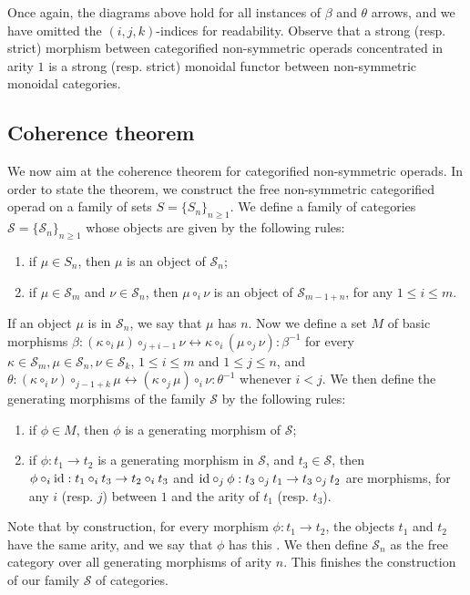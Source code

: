 Once again, the diagrams above hold for all instances of $\beta$ and $\theta$ arrows, and we have omitted the $(i,j,k)$-indices for readability. 
Observe that a strong (resp. strict) morphism between categorified non-symmetric operads concentrated in arity $1$ is a strong (resp. strict) monoidal functor between non-symmetric monoidal categories. 


\subsection{Coherence theorem}

We now aim at the coherence theorem for categorified non-symmetric operads.
In order to state the theorem, we construct the free non-symmetric categorified operad on a family of sets $S=\{S_n\}_{n \geq 1}$.
We define a family of categories $\mathcal{S}=\{\mathcal{S}_n\}_{n \geq 1}$ whose objects are given by the following rules:
\begin{enumerate}
    \item if $\mu \in S_n$, then $\mu$ is an object of $\mathcal{S}_n$;
    \item if $\mu \in \mathcal{S}_m$ and $\nu \in \mathcal{S}_n$, then $\mu \circ_i \nu$ is an object of $\mathcal{S}_{m-1+n}$, for any $1 \leq i \leq m$.
\end{enumerate}
If an object $\mu$ is in $\mathcal{S}_n$, we say that $\mu$ has  $n$. 
Now we define a set $M$ of basic morphisms $\beta: (\kappa \circ_i \mu) \circ_{j+i-1} \nu \leftrightarrow \kappa \circ_i (\mu \circ_j \nu) : \beta^{-1}$ for every $\kappa \in \mathcal{S}_m, \mu \in \mathcal{S}_n, \nu \in \mathcal{S}_k$, $1 \leq i \leq m$ and $1 \leq j \leq n$, and $\theta: (\kappa \circ_i \nu) \circ_{j-1+k} \mu \leftrightarrow (\kappa \circ_j \mu) \circ_i \nu : \theta^{-1}$ whenever $i<j$.
We then define the generating morphisms of the family $\mathcal{S}$ by the following rules:
\begin{enumerate}
    \item if $\phi \in M$, then $\phi$ is a generating morphism of $\mathcal{S}$; 
    \item if $\phi : t_1 \to t_2$ is a generating morphism in $\mathcal{S}$, and $t_3 \in \mathcal{S}$, then $\phi \circ_i \mathrm{id} : t_1 \circ_i t_3 \to t_2 \circ_i t_3$ and $\mathrm{id} \circ_j \phi : t_3 \circ_j t_1 \to t_3 \circ_j t_2$ are  morphisms, for any $i$ (resp. $j$) between $1$ and the arity of $t_1$ (resp. $t_3$).
\end{enumerate}
Note that by construction, for every morphism $\phi : t_1 \to t_2$, the objects $t_1$ and $t_2$ have the same arity, and we say that $\phi$ has this . 
We then define $\mathcal{S}_n$ as the free category over all generating morphisms of arity $n$. 
This finishes the construction of our family $\mathcal{S}$ of categories.

